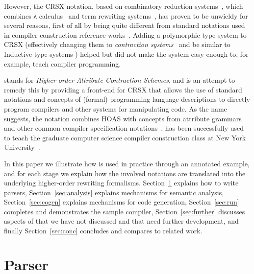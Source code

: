 \documentclass[letterpaper]{article}
\begin{document}
However, the CRSX notation, based on combinatory reduction systems~\cite{Klop:1980,Klop+:tcs1993},
which combines λ calculus~\cite{Church:1941,Barendregt:1984} and term rewriting
systems~\cite{Klop:1992:Handbook}, has proven to be unwieldy for several reasons, first of all by
being quite different from standard notations used in compiler construction reference
works~\cite{Aho+:2006}. Adding a polymorphic type system to CRSX (effectively changing them to
\emph{contraction systems}~\cite{Aczel:1978} and be similar to Inductive-type-systems
\cite{BlanquiJouannaudOkada:tcs2002}) helped but did not make the system easy enough to, for
example, teach compiler programming.

\HAX stands for \emph{Higher-order Attribute Contraction Schemes}, and is an attempt to remedy this
by providing a front-end for CRSX that allows the use of standard notations and concepts of (formal)
programming language descriptions to directly program compilers and other systems for manipulating
code. As the name suggests, the notation combines HOAS with concepts from attribute
grammars~\cite{Knuth:mst1968} and other common compiler specification
notations~\cite{Aho+:2006}. \HAX has been successfully used to teach the graduate computer science
compiler construction class at New York University~\cite{RoseRose:cims2015}.

In this paper we illustrate how \HAX is used in practice through an annotated example, and for each
stage we explain how the involved \HAX notations are translated into the underlying higher-order
rewriting formalisms.
Section~\ref{sec:parse} explains how to write parsers, %
Section~\ref{sec:analysis} explains mechanisms for semantic analysis, %
Section~\ref{sec:cogen} explains mechanisms for code generation, %
Section~\ref{sec:run} completes and demonstrates the sample compiler, %
Section~\ref{sec:further} discusses aspects of \HAX that we have not discussed and that need further
development, %
and finally Section~\ref{sec:conc} concludes and compares to related work.


\section{Parser}
\label{sec:parse}
\end{document}
